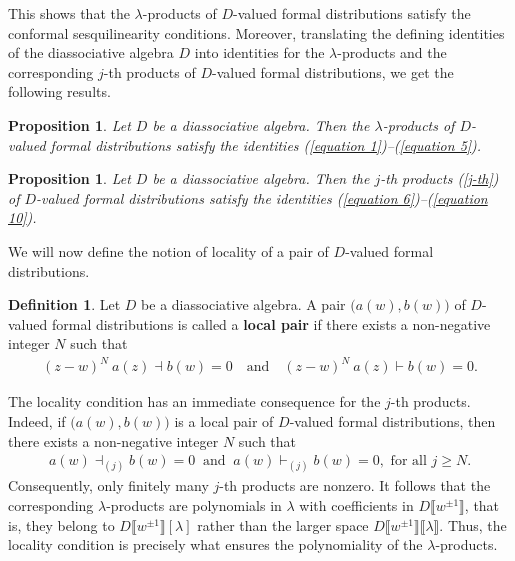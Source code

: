 \documentclass[a4paper,reqno,10pt]{amsart}
\theoremstyle{plain}
\newtheorem{proposition}[thm]{Proposition}
\theoremstyle{definition}
\newtheorem{definition}[thm]{Definition}
\theoremstyle{remark}
\newcommand{\la}{\lambda}
\begin{document}
This shows that the $\la$-products of $D$-valued formal distributions satisfy the conformal sesquilinearity conditions. Moreover, translating the defining identities of the diassociative algebra $D$ into identities for the $\la$-products and the corresponding $j$-th products of $D$-valued formal distributions, we get the following results.
\begin{proposition}
    Let $D$ be a diassociative algebra. Then the $\la$-products of $D$-valued formal distributions satisfy the identities {\rm (\ref{equation 1})--(\ref{equation 5})}.
\end{proposition}
\begin{proposition}
    Let $D$ be a diassociative algebra. Then the $j$-th products (\ref{j-th}) of $D$-valued formal distributions satisfy the identities {\rm (\ref{equation 6})--(\ref{equation 10})}.
\end{proposition}
We will now define the notion of locality of a pair of $D$-valued formal distributions.
\begin{definition}
    Let $D$ be a diassociative algebra. A pair $\big(a(w),b(w)\big)$ of $D$-valued formal distributions is called a {\bf local pair} if there exists a non-negative integer $N$ such that 
    \begin{align*}
        (z-w)^{N} ~ \! a(z) \dashv b(w) =0 ~~~\text{ and } ~~~   (z-w)^{N} ~ \! a(z) \vdash b(w) =0.
    \end{align*}
\end{definition}
The locality condition has an immediate consequence for the $j$-th products. Indeed, if $\big(a(w),b(w)\big)$ is a local pair of $D$-valued formal distributions, then there exists a non-negative integer $N$ such that  
\begin{align*}
    a(w) \dashv_{(j)} b(w) =0 ~  \text{ and } ~ a(w) \vdash_{(j)}b(w)=0, \text{ for all } j \geq N.
    \end{align*}
   Consequently, only finitely many $j$-th products are nonzero. It follows that the corresponding $\la$-products are polynomials in $\la$ with coefficients in $D\llbracket w^{\pm1}\rrbracket$, that is, they belong to $D\llbracket w^{\pm1}\rrbracket[\la]$ rather than the larger space $D\llbracket w^{\pm1}\rrbracket\llbracket\la\rrbracket$. Thus, the locality condition is precisely what ensures the polynomiality of the $\la$-products.
\end{document}
